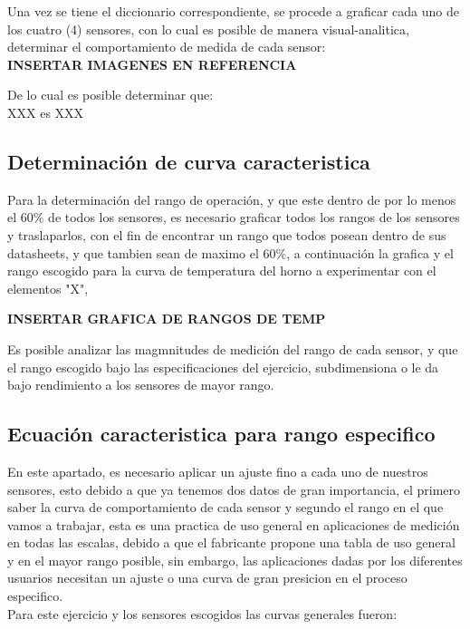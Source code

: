 \documentclass[conference]{IEEEtran}
\begin{document}
Una vez se tiene el diccionario correspondiente, se procede a graficar cada uno de los cuatro (4) sensores, con lo cual es posible de manera visual-analitica, determinar el comportamiento de medida de cada sensor:\\

\textbf{INSERTAR IMAGENES EN REFERENCIA}

De lo cual es posible determinar que:\\

XXX es XXX

\subsection{Determinación de curva caracteristica}

Para la determinación del rango de operación, y que este dentro de por lo menos el 60\% de todos los sensores, es necesario graficar todos los rangos de los sensores y traslaparlos, con el fin de encontrar un rango que todos posean dentro de sus datasheets, y que tambien sean de maximo el 60\%, a continuación la grafica y el rango escogido para la curva de temperatura del horno a experimentar con el elementos "X",


\textbf{INSERTAR GRAFICA DE RANGOS DE TEMP}

Es posible analizar las magmnitudes de medición del rango de cada sensor, y que el rango escogido bajo las especificaciones del ejercicio, subdimensiona o le da bajo rendimiento a los sensores de mayor rango.


\subsection{Ecuación caracteristica para rango especifico}

En este apartado, es necesario aplicar un ajuste fino a cada uno de nuestros sensores, esto debido a que ya tenemos dos datos de gran importancia, el primero saber la curva de comportamiento de cada sensor y segundo el rango en el que vamos a trabajar, esta es una practica de uso general en aplicaciones de medición en todas las escalas, debido a que el fabricante propone una tabla de uso general y en el mayor rango posible, sin embargo, las aplicaciones dadas por los diferentes usuarios necesitan un ajuste o una curva de gran presicion en el proceso especifico.\\

Para este ejercicio y los sensores escogidos las curvas generales fueron:\\
\end{document}
